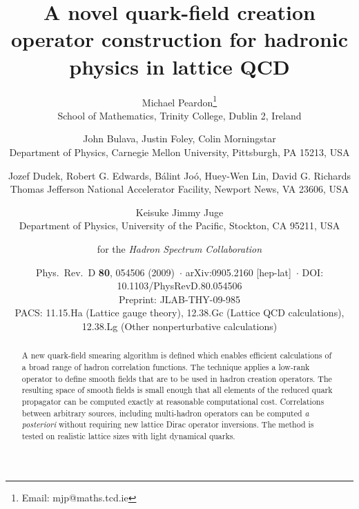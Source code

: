 \documentclass[11pt]{article}
\title{\bfseries A novel quark-field creation operator construction for
hadronic physics in lattice QCD}
\author{Michael Peardon\thanks{Email: mjp@maths.tcd.ie}\\
  \normalsize School of Mathematics, Trinity College, Dublin 2, Ireland
  \and John Bulava, Justin Foley, Colin Morningstar\\
  \normalsize Department of Physics, Carnegie Mellon University,
  Pittsburgh, PA 15213, USA
  \and Jozef Dudek, Robert G. Edwards, B\'alint Jo\'o, Huey-Wen Lin,
  David G. Richards\\
  \normalsize Thomas Jefferson National Accelerator Facility, Newport News,
  VA 23606, USA
  \and Keisuke Jimmy Juge\\
  \normalsize Department of Physics, University of the Pacific,
  Stockton, CA 95211, USA
  \and \large for the {\em Hadron Spectrum Collaboration}}
\date{%
  {\small Phys.\ Rev.\ D \textbf{80}, 054506 (2009)~$\cdot$
  arXiv:0905.2160 [hep-lat]~$\cdot$
  DOI: 10.1103/PhysRevD.80.054506}\\[2mm]
  {\small Preprint: JLAB-THY-09-985}\\[2mm]
  {\small PACS: 11.15.Ha (Lattice gauge theory),
  12.38.Gc (Lattice QCD calculations),
  12.38.Lg (Other nonperturbative calculations)}%
}
\begin{document}
\maketitle

\begin{abstract}
A new quark-field smearing algorithm is defined which enables efficient
calculations of a broad range of hadron correlation functions.
The technique applies a low-rank operator to define smooth fields that are
to be used in hadron creation operators.
The resulting space of smooth fields is small enough that all
elements of the
reduced quark propagator can be computed exactly at reasonable computational
cost. Correlations between arbitrary sources, including multi-hadron
operators can be computed
{\em a posteriori} without requiring new lattice Dirac operator inversions.
The method is tested on realistic lattice sizes with light dynamical quarks.
\end{abstract}







\end{document}
